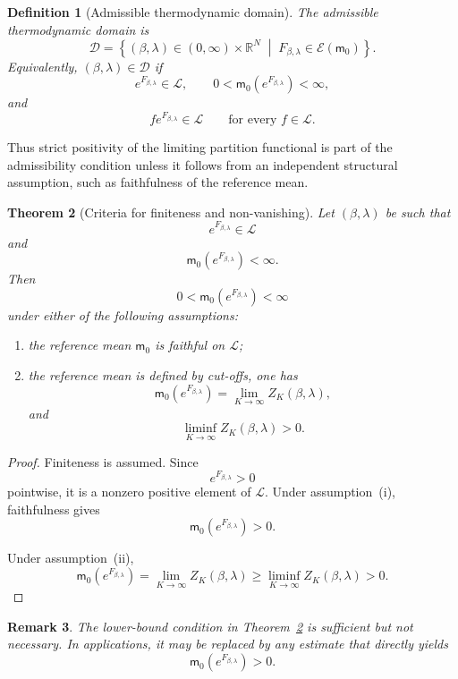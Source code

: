 \documentclass[10pt,a4paper]{amsart}
\newtheorem{Theorem}{Theorem}[section]
\newtheorem{Definition}[Theorem]{Definition}
\newtheorem{rem}[Theorem]{Remark}
\begin{document}
\begin{Definition}[Admissible thermodynamic domain]
\label{def:admissible-domain}
The admissible thermodynamic domain is
\[
\mathcal D
=
\left\{
(\beta,\lambda)\in(0,\infty)\times\mathbb R^N
\;\middle|\;
F_{\beta,\lambda}\in\mathcal E(\mathsf m_0)
\right\}.
\]
Equivalently, $(\beta,\lambda)\in\mathcal D$ if
\[
e^{F_{\beta,\lambda}}\in\mathcal L,
\qquad
0<
\mathsf m_0(e^{F_{\beta,\lambda}})
<\infty,
\]
and
\[
fe^{F_{\beta,\lambda}}\in\mathcal L
\qquad
\text{for every }f\in\mathcal L.
\]
\end{Definition}

Thus strict positivity of the limiting partition functional is part of
the admissibility condition unless it follows from an independent
structural assumption, such as faithfulness of the reference mean.

\begin{Theorem}[Criteria for finiteness and non-vanishing]
\label{thm:partition-positive}
\label{prop:partition-nonvanishing}
Let $(\beta,\lambda)$ be such that
\[
e^{F_{\beta,\lambda}}\in\mathcal L
\]
and
\[
\mathsf m_0(e^{F_{\beta,\lambda}})<\infty.
\]
Then
\[
0<
\mathsf m_0(e^{F_{\beta,\lambda}})
<\infty
\]
under either of the following assumptions:
\begin{enumerate}
\item[\textup{(i)}] the reference mean $\mathsf m_0$ is faithful on
$\mathcal L$;
\item[\textup{(ii)}] the reference mean is defined by cut-offs, one has
\[
\mathsf m_0(e^{F_{\beta,\lambda}})
=
\lim_{K\to\infty}Z_K(\beta,\lambda),
\]
and
\[
\liminf_{K\to\infty}Z_K(\beta,\lambda)>0.
\]
\end{enumerate}
\end{Theorem}

\begin{proof}
Finiteness is assumed. Since
\[
e^{F_{\beta,\lambda}}>0
\]
pointwise, it is a nonzero positive element of $\mathcal L$. Under
assumption~\textup{(i)}, faithfulness gives
\[
\mathsf m_0(e^{F_{\beta,\lambda}})>0.
\]

Under assumption~\textup{(ii)},
\[
\mathsf m_0(e^{F_{\beta,\lambda}})
=
\lim_{K\to\infty}Z_K(\beta,\lambda)
\geq
\liminf_{K\to\infty}Z_K(\beta,\lambda)>0.
\]
\end{proof}

\begin{rem}
The lower-bound condition in
Theorem~\ref{thm:partition-positive} is sufficient but not necessary. In
applications, it may be replaced by any estimate that directly yields
\[
\mathsf m_0(e^{F_{\beta,\lambda}})>0.
\]
\end{rem}
\end{document}

